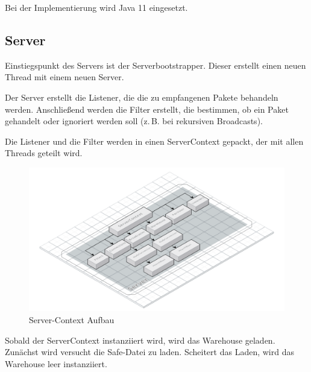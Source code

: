 
Bei der Implementierung wird Java 11 eingesetzt.
\subsection{Server}
Einstiegspunkt des Servers ist der Serverbootstrapper. Dieser erstellt einen neuen Thread mit einem neuen Server. 

Der Server erstellt die Listener, die die zu empfangenen Pakete behandeln werden. Anschließend werden die Filter erstellt, die bestimmen, ob ein Paket gehandelt oder ignoriert werden soll (z.\,B. bei rekursiven Broadcasts).


Die Listener und die Filter werden in einen ServerContext gepackt, der mit allen Threads geteilt wird.
\clearpage

\begin{figure}[h]
    \centering
    \includegraphics[width=\textwidth]{VS-Server-Context.png}
    
    \caption{Server-Context Aufbau}
\end{figure}


Sobald der ServerContext instanziiert wird, wird das Warehouse geladen. 
Zunächst wird versucht die Safe-Datei zu laden. Scheitert das Laden, wird das Warehouse leer instanziiert.




